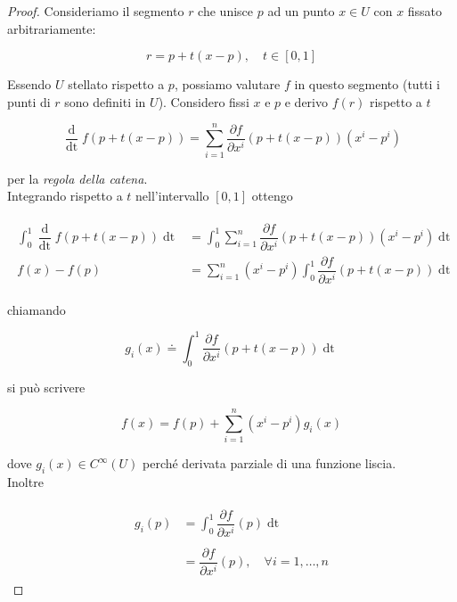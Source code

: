 \begin{proof}
	Consideriamo il segmento $ r $ che  unisce $ p $ ad un punto $ x \in U $ con $ x $ fissato  arbitrariamente:
	
	\begin{equation}
		r=p+t(x-p), \quad t \in [0,1]
	\end{equation}
	
	Essendo $ U $ stellato rispetto a $ p $, possiamo valutare $ f $ in questo segmento (tutti i punti di $ r $ sono definiti in $ U $). Considero fissi $ x $ e $ p $ e derivo $ f(r) $ rispetto a $ t $
	
	\begin{equation}
		\dfrac{\operatorname{d}}{\operatorname{dt}} f(p+t(x-p)) = \sum_{i=1}^{n} \dfrac{\partial f}{\partial x^{i}} (p+t(x-p)) (x^{i}-p^{i})
	\end{equation}
	
	per la \textit{regola della catena}.\\
	Integrando rispetto a $ t $ nell'intervallo $ [0,1] $ ottengo
	
	\begin{align}
		\begin{split}
			\int_{0}^{1} \dfrac{\operatorname{d}}{\operatorname{dt}} f(p+t(x-p)) \operatorname{dt} &= \int_{0}^{1} \sum_{i=1}^{n} \dfrac{\partial f}{\partial x^{i}} (p+t(x-p)) (x^{i}-p^{i}) \operatorname{dt}\\
			f(x) - f(p)&= \sum_{i=1}^{n} (x^{i}-p^{i}) \int_{0}^{1} \dfrac{\partial f}{\partial x^{i}} (p+t(x-p)) \operatorname{dt}
		\end{split}
	\end{align}
	
	chiamando
	
	\begin{equation}
		g_{i}(x) \doteq \int_{0}^{1} \dfrac{\partial f}{\partial x^{i}} (p+t(x-p)) \operatorname{dt}
	\end{equation}
	
	si può scrivere
	
	\begin{equation}
		f(x)= f(p) + \sum_{i=1}^{n} (x^{i}-p^{i}) g_{i}(x)
	\end{equation}
	
	dove $ g_{i}(x) \in C^{\infty}(U) $ perché derivata parziale di una funzione liscia.\\
	Inoltre
	
	\begin{align}
		\begin{split}
			g_{i}(p) &= \int_{0}^{1} \dfrac{\partial f}{\partial x^{i}} (p) \operatorname{dt}\\\\
			&= \dfrac{\partial f}{\partial x^{i}} (p), \quad \forall i=1,\dots,n
		\end{split}
	\end{align}
\end{proof}

